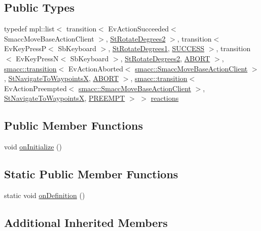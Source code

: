 \subsection*{Public Types}
\begin{DoxyCompactItemize}
\item 
typedef mpl\+::list$<$ transition$<$ Ev\+Action\+Succeeded$<$ Smacc\+Move\+Base\+Action\+Client $>$, \hyperlink{structStRotateDegrees2}{St\+Rotate\+Degrees2} $>$, transition$<$ Ev\+Key\+PressP$<$ Sb\+Keyboard $>$, \hyperlink{structStRotateDegrees1}{St\+Rotate\+Degrees1}, \hyperlink{classSUCCESS}{S\+U\+C\+C\+E\+SS} $>$, transition$<$ Ev\+Key\+PressN$<$ Sb\+Keyboard $>$, \hyperlink{structStRotateDegrees2}{St\+Rotate\+Degrees2}, \hyperlink{classABORT}{A\+B\+O\+RT} $>$, \hyperlink{classsmacc_1_1transition}{smacc\+::transition}$<$ Ev\+Action\+Aborted$<$ \hyperlink{classsmacc_1_1SmaccMoveBaseActionClient}{smacc\+::\+Smacc\+Move\+Base\+Action\+Client} $>$, \hyperlink{structStNavigateToWaypointsX}{St\+Navigate\+To\+WaypointsX}, \hyperlink{classABORT}{A\+B\+O\+RT} $>$, \hyperlink{classsmacc_1_1transition}{smacc\+::transition}$<$ Ev\+Action\+Preempted$<$ \hyperlink{classsmacc_1_1SmaccMoveBaseActionClient}{smacc\+::\+Smacc\+Move\+Base\+Action\+Client} $>$, \hyperlink{structStNavigateToWaypointsX}{St\+Navigate\+To\+WaypointsX}, \hyperlink{classPREEMPT}{P\+R\+E\+E\+M\+PT} $>$ $>$ \hyperlink{structStNavigateForward1_ad7f9fc7db21a3c8faf066a145bf84002}{reactions}
\end{DoxyCompactItemize}
\subsection*{Public Member Functions}
\begin{DoxyCompactItemize}
\item 
void \hyperlink{structStNavigateForward1_a49134dde57b432385db0ba37201434e0}{on\+Initialize} ()
\end{DoxyCompactItemize}
\subsection*{Static Public Member Functions}
\begin{DoxyCompactItemize}
\item 
static void \hyperlink{structStNavigateForward1_a66864ba466c3c39a40232240dde0a9e3}{on\+Definition} ()
\end{DoxyCompactItemize}
\subsection*{Additional Inherited Members}


